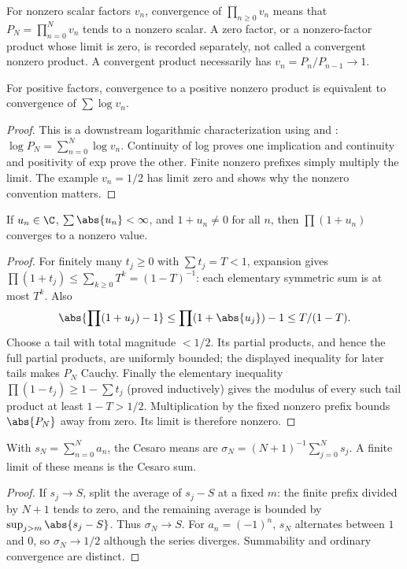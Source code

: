 \begin{definition}
For nonzero scalar factors $v_n$, convergence of $\prod_{n\geq0}v_n$ means that $P_N=\prod_{n=0}^Nv_n$ tends to a nonzero scalar. A zero factor, or a nonzero-factor product whose limit is zero, is recorded separately, not called a convergent nonzero product. A convergent product necessarily has $v_n=P_n/P_{n-1}\to1$.
\end{definition}
\begin{theorem}
For positive factors, convergence to a positive nonzero product is equivalent to convergence of $\sum\log v_n$.
\end{theorem}
\begin{proof}
This is a downstream logarithmic characterization using  and : $\log P_N=\sum_{n=0}^N\log v_n$. Continuity of log proves one implication and continuity and positivity of exp prove the other. Finite nonzero prefixes simply multiply the limit. The example $v_n=1/2$ has limit zero and shows why the nonzero convention matters.
\end{proof}

\begin{theorem}
If $u_n\in\C$, $\sum\abs{u_n}<\infty$, and $1+u_n\ne0$ for all $n$, then $\prod(1+u_n)$ converges to a nonzero value.
\end{theorem}
\begin{proof}
For finitely many $t_j\geq0$ with $\sum t_j=T<1$, expansion gives $\prod(1+t_j)\leq\sum_{k\geq0}T^k=(1-T)^{-1}$: each elementary symmetric sum is at most $T^k$. Also
\[\abs{\prod(1+u_j)-1}\leq\prod(1+\abs{u_j})-1\leq T/(1-T).\]
Choose a tail with total magnitude $<1/2$. Its partial products, and hence the full partial products, are uniformly bounded; the displayed inequality for later tails makes $P_N$ Cauchy. Finally the elementary inequality $\prod(1-t_j)\geq1-\sum t_j$ (proved inductively) gives the modulus of every such tail product at least $1-T>1/2$. Multiplication by the fixed nonzero prefix bounds $\abs{P_N}$ away from zero. Its limit is therefore nonzero.
\end{proof}

\begin{definition}
With $s_N=\sum_{n=0}^Na_n$, the Cesaro means are $\sigma_N=(N+1)^{-1}\sum_{j=0}^Ns_j$. A finite limit of these means is the Cesaro sum.
\end{definition}
\begin{proof}
If $s_j\to S$, split the average of $s_j-S$ at a fixed $m$: the finite prefix divided by $N+1$ tends to zero, and the remaining average is bounded by $\sup_{j>m}\abs{s_j-S}$. Thus $\sigma_N\to S$. For $a_n=(-1)^n$, $s_N$ alternates between $1$ and $0$, so $\sigma_N\to1/2$ although the series diverges. Summability and ordinary convergence are distinct.
\end{proof}

